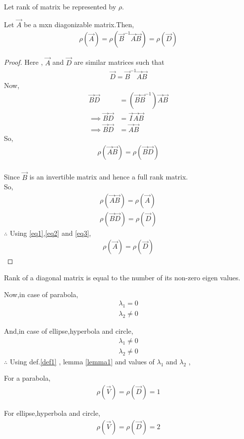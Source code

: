 \documentclass[journal,12pt,twocolumn]{IEEEtran}
\begin{document}
Let rank of matrix be represented by $\rho$.

\begin{lemma}
\label{lemma1}
Let $\vec{A}$ be a mxn diagonizable matrix.Then,
\begin{align}
   \rho(\vec{A}) = \rho(\vec{B}^{-1}\vec{A}\vec{B}) = \rho(\vec{D}) \label{eqq1}
\end{align}
\end{lemma}

\begin{proof}
Here , $\vec{A}$ and $\vec{D}$ are similar matrices such that 
\begin{align}
    \vec{D} = \vec{B}^{-1}\vec{A}\vec{B}
\end{align}
Now,
\begin{align}
    \vec{B}\vec{D} &= (\vec{B}\vec{B}^{-1})\vec{A}\vec{B}
    \\
    \implies \vec{B}\vec{D} &= \vec{I}\vec{A}\vec{B}
    \\
    \implies \vec{B}\vec{D} &= \vec{A}\vec{B}
\end{align}
So,
\begin{align}
    \rho(\vec{A}\vec{B}) = \rho(\vec{B}\vec{D}) \label{eq1}
\end{align}
\\
Since $\vec{B}$ is an invertible matrix and hence a full rank matrix.
\\
So,
\begin{align}
    \rho(\vec{A}\vec{B}) = \rho(\vec{A}) \label{eq2}
    \\
    \rho(\vec{B}\vec{D}) = \rho(\vec{D}) \label{eq3}
\end{align}
$\therefore$ Using \eqref{eq1},\eqref{eq2} and \eqref{eq3},
\begin{align}
    \rho(\vec{A}) = \rho(\vec{D})
\end{align}
\end{proof}

\begin{definition}
Rank of a diagonal matrix is equal to the number of its non-zero eigen values. \label{def1}
\end{definition}

Now,in case of parabola, 
\begin{align}
    \lambda_1 =0 
    \\
    \lambda_2 \neq 0 
\end{align}

And,in case of ellipse,hyperbola and circle, \label{result2}
\begin{align}
    \lambda_1 \neq 0 
    \\
    \lambda_2 \neq 0 
\end{align}
$\therefore$
Using def.\ref{def1} , lemma \ref{lemma1} and values of $\lambda_1$ and $\lambda_2$ ,

For a parabola,
\begin{align}
    \rho(\vec{V}) = \rho(\vec{D}) = 1
\end{align}

For ellipse,hyperbola and circle,
\begin{align}
    \rho(\vec{V}) = \rho(\vec{D}) = 2
\end{align}
\end{document}
